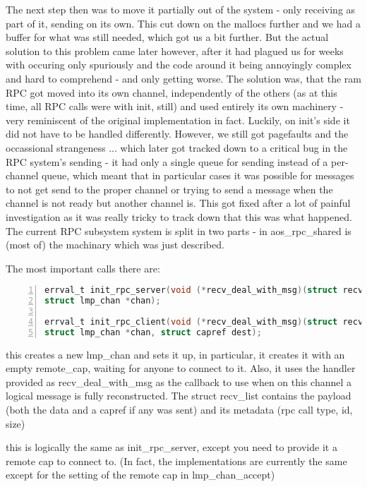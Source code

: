 The next step then was to move it partially out of the system - only receiving as part of it, sending on its own. This cut down on the mallocs further and we had a buffer for what was still needed, which got us a bit further. But the actual solution to this problem came later however, after it had plagued us for weeks with occuring only spuriously and the code around it being annoyingly complex and hard to comprehend - and only getting worse.
The solution was, that the ram RPC got moved into its own channel, independently of the others (as at this time, all RPC calls were with init, still) and used entirely its own machinery - very reminiscent of the original implementation in fact. Luckily, on init's side it did not have to be handled differently.
However, we still got pagefaults and the occassional strangeness ... which later got tracked down to a critical bug in the RPC system's sending - it had only a single queue for sending instead of a per-channel queue, which meant that in particular cases it was possible for messages to not get send to the proper channel or trying to send a message when the channel is not ready but another channel is. This got fixed after a lot of painful investigation as it was really tricky to track down that this was what happened.
The current RPC subsystem system is split in two parts - in aos\_rpc\_shared is (most of) the machinary which was just described.

The most important calls there are:

\begin{lstlisting}[caption={rpc system inits}, 
label=lst:allocation, numbers=left, stepnumber=1, float, floatplacement=tl, 
frame=tb, language=c]
errval_t init_rpc_server(void (*recv_deal_with_msg)(struct recv_list *),
struct lmp_chan *chan);

errval_t init_rpc_client(void (*recv_deal_with_msg)(struct recv_list *),
struct lmp_chan *chan, struct capref dest);
\end{lstlisting}

this creates a new lmp\_chan and sets it up, in particular, it creates it with an empty remote\_cap, waiting for anyone to connect to it. Also, it uses the handler provided as recv\_deal\_with\_msg as the callback to use when on this channel a logical message is fully reconstructed. The struct recv\_list contains the payload (both the data and a capref if any was sent) and its metadata (rpc call type, id, size)

this is logically the same as init\_rpc\_server, except you need to provide it a remote cap to connect to. (In fact, the implementations are currently the same except for the setting of the remote cap in lmp\_chan\_accept)


